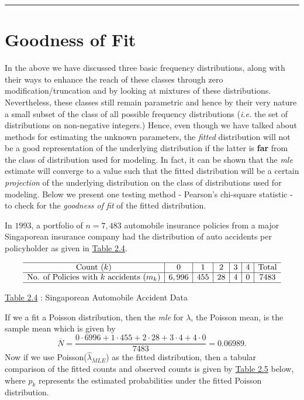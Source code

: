 \documentclass[]{book}
\theoremstyle{definition}
\theoremstyle{definition}
\theoremstyle{definition}
\theoremstyle{remark}
\begin{document}
\begin{center}\rule{0.5\linewidth}{\linethickness}\end{center}

\section{Goodness of Fit}\label{S:goodness-of-fit}

In the above we have discussed three basic frequency distributions,
along with their ways to enhance the reach of these classes through zero
modification/truncation and by looking at mixtures of these
distributions. Nevertheless, these classes still remain parametric and
hence by their very nature a small subset of the class of all possible
frequency distributions (\emph{i.e.} the set of distributions on
non-negative integers.) Hence, even though we have talked about methods
for estimating the unknown parameters, the \emph{fitted} distribution
will not be a good representation of the underlying distribution if the
latter is \textbf{far} from the class of distribution used for modeling.
In fact, it can be shown that the \emph{mle} estimate will converge to a
value such that the fitted distribution will be a certain
\emph{projection} of the underlying distribution on the class of
distributions used for modeling. Below we present one testing method -
Pearson's chi-square statistic - to check for the \emph{goodness of fit}
of the fitted distribution.

In \(1993\), a portfolio of \(n=7,483\) automobile insurance policies
from a major Singaporean insurance company had the distribution of auto
accidents per policyholder as given in \protect\hyperlink{tab:2.4}{Table
2.4}.

\[\begin{matrix}
\begin{array}{c|c|c|c|c|c|c}
\hline
\text{Count }(k) & 0 & 1 & 2 & 3 & 4 & \text{Total}\\
\hline
\text{No. of Policies with }k\text{ accidents }(m_k) & 6,996 & 455 & 28 & 4 & 0 & 7483\\
\hline
\end{array}
\end{matrix}\]

\protect\hyperlink{tab:2.4}{Table 2.4} : Singaporean Automobile Accident
Data

If we a fit a Poisson distribution, then the \emph{mle} for \(\lambda\),
the Poisson mean, is the sample mean which is given by \[
\overline{N} = \frac{0\cdot 6996 + 1 \cdot 455 + 2 \cdot 28 + 3 \cdot 4 + 4 \cdot 0}{7483} = 0.06989.
\] Now if we use Poisson(\(\hat{\lambda}_{MLE}\)) as the fitted
distribution, then a tabular comparison of the fitted counts and
observed counts is given by \protect\hyperlink{tab:2.5}{Table 2.5}
below, where \(\hat{p}_k\) represents the estimated probabilities under
the fitted Poisson distribution.
\end{document}
